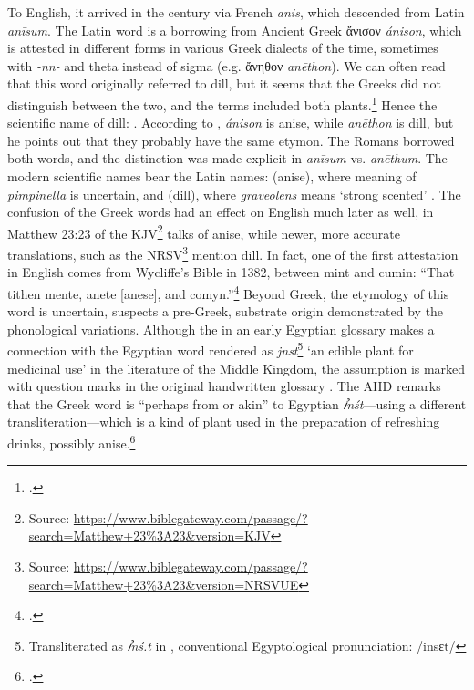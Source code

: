 To English, it arrived in the  century via French \textit{anis}, which descended from Latin \textit{anīsum}. The Latin word is a borrowing from Ancient Greek ἄνισον \textit{ánison}, which is attested in different forms in various Greek dialects of the time, sometimes with \textit{-nn-} and theta instead of sigma (e.g. ἄνηθον \textit{anēthon}). We can often read that this word originally referred to dill, but it seems that the Greeks did not distinguish between the two, and the terms included both plants.\footcite[anise]{oed} Hence the scientific name of dill: . According to \textcite[103,107]{beekes_etymological_2010}, \textit{ánison} is anise, while \textit{anēthon} is dill, but he points out that they probably have the same etymon. The Romans borrowed both words, and the distinction was made explicit in \textit{anīsum} vs. \textit{anēthum}. The modern scientific names bear the Latin names:  (anise), where meaning of \textit{pimpinella} is uncertain, and  (dill), where \textit{graveolens} means `strong scented' \autocite[184,303]{gledhill_names_2008}. The confusion of the Greek words had an effect on English much later as well, in Matthew 23:23 of the \gls{KJV}\footnote{Source: \url{https://www.biblegateway.com/passage/?search=Matthew+23\%3A23&version=KJV}} talks of anise, while newer, more accurate translations, such as the \gls{NRSV}\footnote{Source: \url{https://www.biblegateway.com/passage/?search=Matthew+23\%3A23&version=NRSVUE}} mention dill. In fact, one of the first attestation in English comes from Wycliffe's Bible in 1382, between mint and cumin: ``That tithen mente, anete [anese], and comyn.''\footcite[anise]{oed} Beyond Greek, the etymology of this word is uncertain, \textcite[103,107]{beekes_etymological_2010} suspects a pre-Greek, substrate origin demonstrated by the phonological variations. Although the  in an early Egyptian glossary makes a connection with the Egyptian word rendered as \textit{jnst}\footnote{Transliterated as \textit{ꞽnś.t} in \textcite[99]{erman_worterbuch_1926}, conventional Egyptological pronunciation: /insɛt/} `an edible plant for medicinal use' in the literature of the Middle Kingdom, the assumption is marked with question marks in the original handwritten glossary \autocites[240]{hemmerdinger_noms_1968}[99]{erman_worterbuch_1926}. The \gls{AHD} remarks that the Greek word is ``perhaps from or akin'' to Egyptian \textit{ꞽnśt}---using a different transliteration---which is a kind of plant used in the preparation of refreshing drinks, possibly anise.\footcite[anise ]{ahd} 

